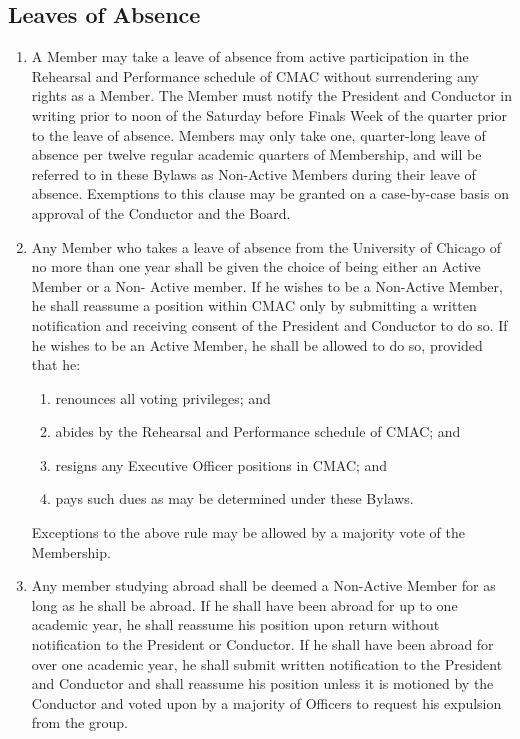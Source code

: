 \documentclass{article}
\begin{document}
\subsection{Leaves of Absence}
\begin{enumerate}
\item A Member may take a leave of absence from active participation in
the Rehearsal and Performance schedule of CMAC without surrendering
any rights as a Member. The Member must notify the President and Conductor
in writing prior to noon of the Saturday before Finals Week of the
quarter prior to the leave of absence. Members may only take one,
quarter-long leave of absence per twelve regular academic quarters
of Membership, and will be referred to in these Bylaws as Non-Active
Members during their leave of absence. Exemptions to this clause may
be granted on a case-by-case basis on approval of the Conductor and
the Board.
\item Any Member who takes a leave of absence from the University of Chicago
of no more than one year shall be given the choice of being either
an Active Member or a Non- Active member. If he wishes to be a Non-Active
Member, he shall reassume a position within CMAC only by submitting
a written notification and receiving consent of the President and
Conductor to do so. If he wishes to be an Active Member, he shall
be allowed to do so, provided that he:

\begin{enumerate}
\item renounces all voting privileges; and
\item abides by the Rehearsal and Performance schedule of CMAC; and
\item resigns any Executive Officer positions in CMAC; and
\item pays such dues as may be determined under these Bylaws.
\end{enumerate}

Exceptions to the above rule may be allowed by a majority vote of
the Membership.

\item Any member studying abroad shall be deemed a Non-Active Member for
as long as he shall be abroad. If he shall have been abroad for up
to one academic year, he shall reassume his position upon return without
notification to the President or Conductor. If he shall have been
abroad for over one academic year, he shall submit written notification
to the President and Conductor and shall reassume his position unless
it is motioned by the Conductor and voted upon by a majority of Officers
to request his expulsion from the group.
\end{enumerate}
\end{document}
